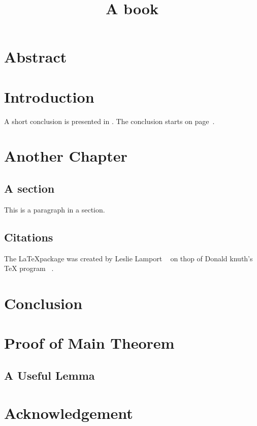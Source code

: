 \documentclass[12pt,a4paper]{book}
\begin{document}
\title{A book}

  
  \frontmatter
    \maketitle
    \tableofcontents
    \chapter{Abstract}
  \mainmatter
    \chapter{Introduction}
      A short conclusion is presented in . 
      The conclusion starts on page~\pageref{conclusion}.
    \chapter{Another Chapter}
      \section{A section}
        This is a paragraph in a section.
      \section{Citations}
        The \LaTeX package was created by Leslie Lamport%
	~\cite{Lamport:94}
        on thop of Donald knuth's \TeX{} program%
	~\cite{Knuth:1990}.
    \chapter{Conclusion}
      \label{conclusion}
    \appendix
      \chapter{Proof of Main Theorem}
        \section{A Useful Lemma}
  \backmatter
    \chapter*{Acknowledgement}
    
\end{document}
